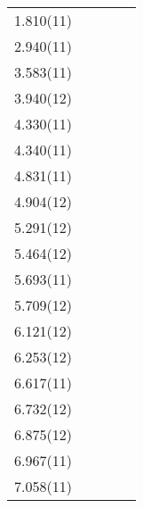 \begin{center}
\begin{longtable}{cc cc c}
1.810(11)              &          &             &                               &               \\
2.940(11)              &          &             &                               &               \\
3.583(11)              &          &             &                               &               \\
3.940(12)              &          &             &                               &               \\
4.330(11)              &          &             &                               &               \\
4.340(11)              &          &             &                               &               \\
4.831(11)              &          &             &                               &               \\
4.904(12)              &          &             &                               &               \\
5.291(12)              &          &             &                               &               \\
5.464(12)              &          &             &                               &               \\
5.693(11)              &          &             &                               &               \\
5.709(12)              &          &             &                               &               \\
6.121(12)              &          &             &                               &               \\
6.253(12)              &          &             &                               &               \\
6.617(11)              &          &             &                               &               \\
6.732(12)              &          &             &                               &               \\
6.875(12)              &          &             &                               &               \\
6.967(11)              &          &             &                               &               \\
7.058(11)              &          &             &                               &               \\

\end{longtable}
\end{center}
